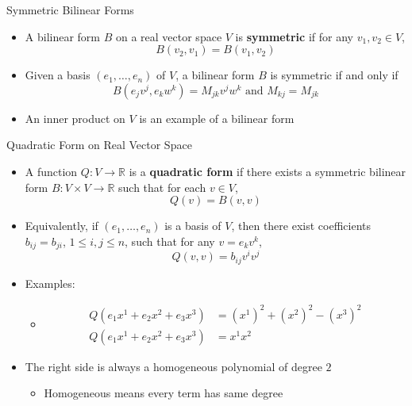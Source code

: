 \documentclass[usenames,dvipsnames,10pt]{beamer}
\newcommand{\R}{\mathbb{R}}
\begin{document}
\begin{frame}
  {Symmetric Bilinear Forms}

  \begin{itemize}
  \item A bilinear form $B$ on a real vector space $V$ is {\bf symmetric} if for any $v_1, v_2 \in V$,
    \[ B(v_2,v_1) = B(v_1,v_2) \]
  \item Given a basis $(e_1, \dots, e_n)$ of $V$, a bilinear form $B$ is symmetric if and only if 
    \[
      B(e_jv^j,e_kw^k) = M_{jk}v^jw^k\text{ and }M_{kj} = M_{jk}
    \]
  \item An inner product on $V$ is an example of a bilinear form
  \end{itemize}
\end{frame}

\begin{frame}
  {Quadratic Form on Real Vector Space}

  \begin{itemize}
  \item A function $Q: V \rightarrow \R$ is a {\bf quadratic form} if there exists a symmetric bilinear form $B: V\times V\rightarrow \R$ such that for each $v \in V$,
    \[
      Q(v) = B(v,v)
    \]
  \item Equivalently, if $(e_1, \dots, e_n)$ is a basis of $V$, then there exist coefficients $b_{ij}=b_{ji}$, $1 \le i,j \le n$, such that for any $v = e_kv^k$,
    \[ Q(v,v) = b_{ij}v^iv^j \]
  \item Examples:
    \begin{itemize}
    \item
      \begin{align*}
        Q(e_1x^1+e_2x^2+e_3x^3) &= (x^1)^2 + (x^2)^2 - (x^3)^2\\
        Q(e_1x^1+e_2x^2+e_3x^3) &= x^1x^2
      \end{align*}
    \end{itemize}
  \item The right side is always a homogeneous polynomial of degree $2$
    \begin{itemize}
    \item Homogeneous means every term has same degree
    \end{itemize}
  \end{itemize}
\end{frame}
\end{document}
